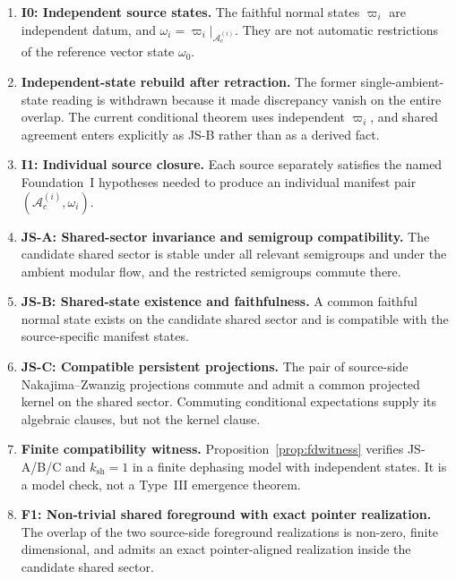 \documentclass[12pt]{article}
\theoremstyle{definition}
\theoremstyle{remark}
\begin{document}
\begin{enumerate}
\item \textbf{I0: Independent source states.} The faithful normal states
  \(\varpi_i\) are independent datum, and
  \(\omega_i=\varpi_i|_{\mathcal A_c^{(i)}}\). They are not automatic
  restrictions of the reference vector state \(\omega_0\).

\item \textbf{Independent-state rebuild after retraction.} The former
  single-ambient-state reading is withdrawn because it made discrepancy
  vanish on the entire overlap. The current conditional theorem uses
  independent \(\varpi_i\), and shared agreement enters explicitly as
  JS-B rather than as a derived fact.

\item \textbf{I1: Individual source closure.} Each source separately
  satisfies the named Foundation~I hypotheses needed to produce an
  individual manifest pair \((\mathcal A_c^{(i)},\omega_i)\).

\item \textbf{JS-A: Shared-sector invariance and semigroup
  compatibility.} The candidate shared sector is stable under all
  relevant semigroups and under the ambient modular flow, and the
  restricted semigroups commute there.

\item \textbf{JS-B: Shared-state existence and faithfulness.} A common
  faithful normal state exists on the candidate shared sector and is
  compatible with the source-specific manifest states.

\item \textbf{JS-C: Compatible persistent projections.} The pair of
  source-side Nakajima--Zwanzig projections commute and admit a common
  projected kernel on the shared sector. Commuting conditional
  expectations supply its algebraic clauses, but not the kernel clause.

\item \textbf{Finite compatibility witness.}
Proposition~\ref{prop:fdwitness} verifies JS-A/B/C and
\(k_{\mathrm{sh}}=1\) in a finite dephasing model with independent
states. It is a model check, not a Type~III emergence theorem.

\item \textbf{F1: Non-trivial shared foreground with exact pointer
  realization.} The overlap of the two source-side foreground
  realizations is non-zero, finite dimensional, and admits an exact
  pointer-aligned realization inside the candidate shared sector.


\end{enumerate}
\end{document}
